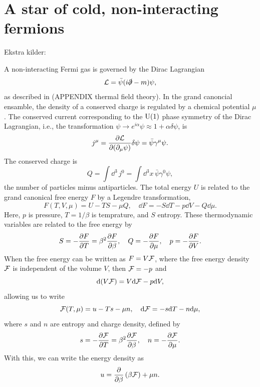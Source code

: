 \section{A star of cold, non-interacting fermions}
Ekstra kilder: \autocite{andersenIntroductionStatisticalMechanics2012,glendenningCompactStarsNuclear2012}

A non-interacting Fermi gas is governed by the Dirac Lagrangian
%
\begin{equation}
    \mathcal{L} = \bar \psi (i \slashed \partial - m) \psi,
\end{equation}
%
as described in (APPENDIX thermal field theory).
In the grand canoncial ensamble, the density of a conserved charge is regulated by a chemical potential $\mu$.
The conserved current corresponding to the $\text U(1)$ phase symmetry of the Dirac Lagrangian, i.e., the transformation $\psi \rightarrow e^{i \alpha} \psi \approx 1 + \alpha \delta \psi$, is
\begin{equation}
    j^\mu = \diffp{\Ell}{(\partial_\mu \psi)} \delta \psi = \bar \psi \gamma^\mu \psi.
\end{equation}
%
The conserved charge is
%
\begin{equation}
    Q = \int \dd^3 \, j^0 = \int \dd^3 x\, \bar \psi \gamma^0 \psi,
\end{equation}
%
the number of particles minus antiparticles.
The total energy $U$ is related to the grand canonical free energy $F$ by a Legendre transformation,
%
\begin{equation}
    F(T, V, \mu) = U - T S - \mu Q, \quad \dd F = - S \dd T - p \dd V - Q \dd \mu.
\end{equation}
%
Here, $p$ is pressure, $T = {1}/{\beta}$ is temprature, and $S$ entropy.
These thermodynamic variables are related to the free energy by
%
\begin{equation}
    S = - \diffp{F}{T} = \beta^2 \diffp{F}{\beta}, \quad
    Q = - \diffp{F}{\mu}, \quad
    p = - \diffp{F}{V}.
\end{equation}
%
When the free energy can be written as $F = V \mathcal{F}$, where the free energy density $\mathcal{F}$ is independent of the volume $V$, then $\mathcal{F} = - p$ and
%
\begin{equation}
    \text{d} (V \mathcal{F}) = V \text{d} \mathcal{F} - p \text{d} V,
\end{equation}
%
allowing us to write
%
\begin{equation}
    \mathcal{F}(T, \mu) = u - Ts - \mu n, \quad
    \text{d} \mathcal{F} = -s \text{d} T - n \text{d} \mu,
\end{equation}
% 
where $s$ and $n$ are entropy and charge density, defined by
%
\begin{equation}
    s = - \diffp{\Eff}{T} = \beta^2 \diffp{\Eff}{\beta}, \quad
    n = - \diffp{\Eff}{\mu}.
\end{equation}
%
With this, we can write the energy density as
%
\begin{equation}
    u = \diffp{}{\beta} \left(\beta \Eff\right) + \mu n.
\end{equation}



